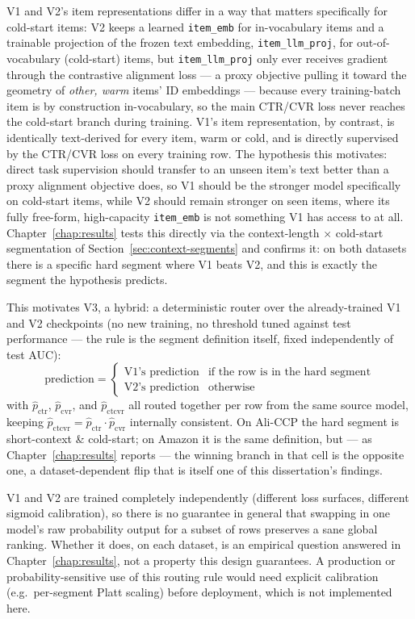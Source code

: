 \documentclass{uclthesis}
\begin{document}
V1 and V2's item representations differ in a way that matters specifically for cold-start items: V2 keeps a learned \texttt{item\_emb} for in-vocabulary items and a trainable projection of the frozen text embedding, \texttt{item\_llm\_proj}, for out-of-vocabulary (cold-start) items, but \texttt{item\_llm\_proj} only ever receives gradient through the contrastive alignment loss --- a proxy objective pulling it toward the geometry of \emph{other, warm} items' ID embeddings --- because every training-batch item is by construction in-vocabulary, so the main CTR/CVR loss never reaches the cold-start branch during training. V1's item representation, by contrast, is identically text-derived for every item, warm or cold, and is directly supervised by the CTR/CVR loss on every training row. The hypothesis this motivates: direct task supervision should transfer to an unseen item's text better than a proxy alignment objective does, so V1 should be the stronger model specifically on cold-start items, while V2 should remain stronger on seen items, where its fully free-form, high-capacity \texttt{item\_emb} is not something V1 has access to at all. Chapter~\ref{chap:results} tests this directly via the context-length $\times$ cold-start segmentation of Section~\ref{sec:context-segments} and confirms it: on both datasets there is a specific hard segment where V1 beats V2, and this is exactly the segment the hypothesis predicts.

This motivates V3, a hybrid: a deterministic router over the already-trained V1 and V2 checkpoints (no new training, no threshold tuned against test performance --- the rule is the segment definition itself, fixed independently of test AUC):
\[
\text{prediction} =
\begin{cases}
  \text{V1's prediction} & \text{if the row is in the hard segment} \\
  \text{V2's prediction} & \text{otherwise}
\end{cases}
\]
with $\hat{p}_{\text{ctr}}$, $\hat{p}_{\text{cvr}}$, and $\hat{p}_{\text{ctcvr}}$ all routed together per row from the same source model, keeping $\hat{p}_{\text{ctcvr}} = \hat{p}_{\text{ctr}} \cdot \hat{p}_{\text{cvr}}$ internally consistent. On Ali-CCP the hard segment is short-context \& cold-start; on Amazon it is the same definition, but --- as Chapter~\ref{chap:results} reports --- the winning branch in that cell is the opposite one, a dataset-dependent flip that is itself one of this dissertation's findings.

V1 and V2 are trained completely independently (different loss surfaces, different sigmoid calibration), so there is no guarantee in general that swapping in one model's raw probability output for a subset of rows preserves a sane global ranking. Whether it does, on each dataset, is an empirical question answered in Chapter~\ref{chap:results}, not a property this design guarantees. A production or probability-sensitive use of this routing rule would need explicit calibration (e.g.\ per-segment Platt scaling) before deployment, which is not implemented here.
\end{document}
